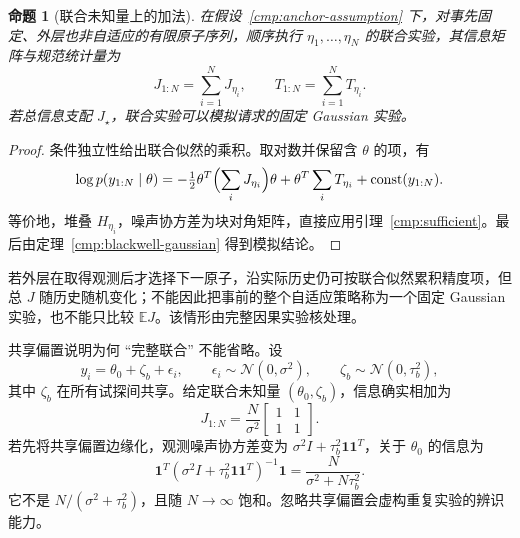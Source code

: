 \documentclass[11pt,a4paper]{article}
\numberwithin{equation}{section}
\newtheorem{proposition}[theorem]{命题}
\theoremstyle{definition}
\newcommand{\E}{\mathbb E}
\begin{document}
\begin{proposition}[联合未知量上的加法]
\label{cmp:additivity}
在假设~\ref{cmp:anchor-assumption} 下，对事先固定、外层也非自适应的有限原子序列，顺序执行 $\eta_1,\ldots,\eta_N$ 的联合实验，其信息矩阵与规范统计量为
\begin{equation}
 J_{1:N}=\sum_{i=1}^N J_{\eta_i},\qquad
 T_{1:N}=\sum_{i=1}^N T_{\eta_i}.
 \label{cmp:additive}
\end{equation}
若总信息支配 $J_\star$，联合实验可以模拟请求的固定 Gaussian 实验。
\end{proposition}
\begin{proof}
条件独立性给出联合似然的乘积。取对数并保留含 $\theta$ 的项，有
\begin{equation}
 \log p(y_{1:N}\mid\theta)
 =-\tfrac12\theta^T\Bigl(\sum_i J_{\eta_i}\Bigr)\theta
   +\theta^T\sum_i T_{\eta_i}+\operatorname{const}(y_{1:N}).
\end{equation}
等价地，堆叠 $H_{\eta_i}$，噪声协方差为块对角矩阵，直接应用引理~\ref{cmp:sufficient}。最后由定理~\ref{cmp:blackwell-gaussian} 得到模拟结论。
\end{proof}

若外层在取得观测后才选择下一原子，沿实际历史仍可按联合似然累积精度项，但总 $J$ 随历史随机变化；不能因此把事前的整个自适应策略称为一个固定 Gaussian 实验，也不能只比较 $\E J$。该情形由完整因果实验核处理。

共享偏置说明为何 ``完整联合'' 不能省略。设
\begin{equation}
 y_i=\theta_0+\zeta_b+\epsilon_i,\qquad
 \epsilon_i\sim\mathcal N(0,\sigma^2),\qquad
 \zeta_b\sim\mathcal N(0,\tau_b^2),
\end{equation}
其中 $\zeta_b$ 在所有试探间共享。给定联合未知量 $(\theta_0,\zeta_b)$，信息确实相加为
\begin{equation}
 J_{1:N}=\frac{N}{\sigma^2}
 \begin{bmatrix}1&1\\1&1\end{bmatrix}.
\end{equation}
若先将共享偏置边缘化，观测噪声协方差变为
$\sigma^2 I+\tau_b^2\mathbf1\mathbf1^T$，关于 $\theta_0$ 的信息为
\begin{equation}
 \mathbf1^T(\sigma^2I+\tau_b^2\mathbf1\mathbf1^T)^{-1}\mathbf1
 =\frac{N}{\sigma^2+N\tau_b^2}.
 \label{cmp:shared-bias}
\end{equation}
它不是 $N/(\sigma^2+\tau_b^2)$，且随 $N\to\infty$ 饱和。忽略共享偏置会虚构重复实验的辨识能力。
\end{document}
